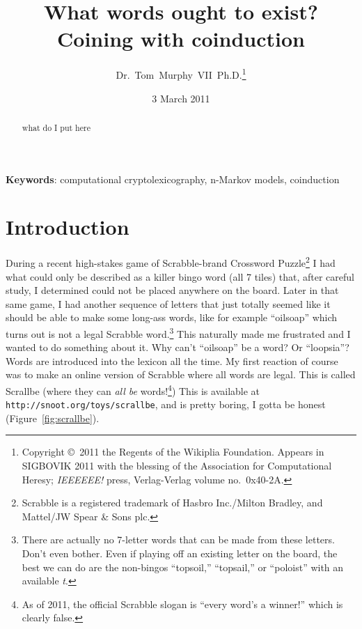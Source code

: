 \documentclass[twocolumn]{article}
\begin{document}
 

\title{What words ought to exist? \\
       {\normalsize Coining with coinduction}}
\author{Dr.~Tom~Murphy~VII~Ph.D.\thanks{
Copyright \copyright\ 2011 the Regents of the Wikiplia
Foundation. Appears in SIGBOVIK 2011 with the blessing of the
Association for Computational Heresy; {\em IEEEEEE!} press,
Verlag-Verlag volume no.~0x40-2A.
}
}


\renewcommand\>{$>$}
\newcommand\<{$<$}

\date{3 March 2011}

\maketitle

\begin{abstract}
what do I put here
\end{abstract}

\vspace{1em}
{\noindent \small {\bf Keywords}:
 computational cryptolexicography, n-Markov models, coinduction
}

\section*{Introduction}
During a recent high-stakes game of Scrabble-brand Crossword
Puzzle\footnote{Scrabble is a registered trademark of Hasbro
  Inc./Milton Bradley, and Mattel/JW Spear \& Sons plc.} I had what
could only be described as a killer bingo word (all 7 tiles) that,
after careful study, I determined could not be placed anywhere on the
board. Later in that same game, I had another sequence of letters that
just totally seemed like it should be able to make some long-ass
words, like for example ``oilsoap'' which turns out is not a legal
Scrabble word.\!\footnote{There are actually no 7-letter words that
  can be made from these letters. Don't even bother. Even if playing
  off an existing letter on the board, the best we can do are the
  non-bingos ``topsoil,'' ``topsail,'' or ``poloist'' with an
  available {\it t}.} This naturally made me frustrated and I wanted
to do something about it. Why can't ``oilsoap'' be a word? Or
``loopsia''? Words are introduced into the lexicon all the time. My
first reaction of course was to make an online version of Scrabble
where all words are legal. This is called Scrallbe (where they can
{\it all be} words!\footnote{As of 2011, the official Scrabble slogan
  is ``every word's a winner!'' which is clearly false.}) This is
available at {\tt http://snoot.org/toys/scrallbe}, and is pretty
boring, I gotta be honest (Figure~\ref{fig:scrallbe}).
\end{document}

